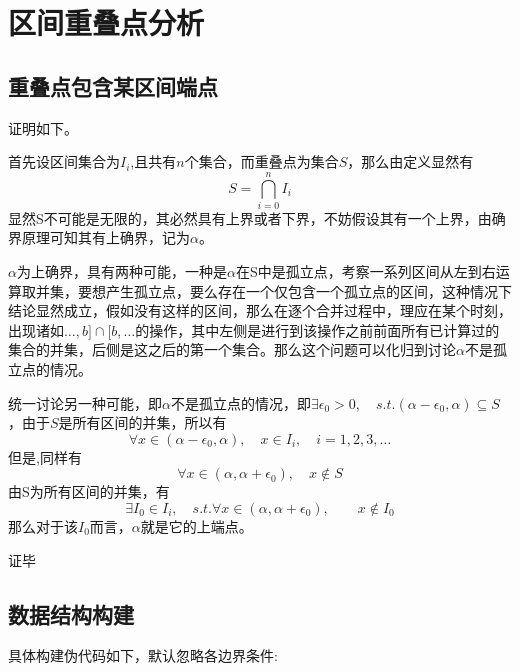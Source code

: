 \documentclass[cn,11pt,chinese]{elegantbook}
\begin{document}
\section{区间重叠点分析}

\subsection{重叠点包含某区间端点}

证明如下。

首先设区间集合为${I_i}$,且共有$n$个集合，而重叠点为集合$S$，那么由定义显然有
\begin{equation}
    S = \bigcap _{i=0}^n I_i \nonumber
\end{equation}
显然S不可能是无限的，其必然具有上界或者下界，不妨假设其有一个上界，由确界原理可知其有上确界，记为$\alpha $。

$\alpha $为上确界，具有两种可能，一种是$\alpha $在S中是孤立点，考察一系列区间从左到右运算取并集，要想产生孤立点，要么存在一个仅包含一个孤立点的区间，这种情况下结论显然成立，假如没有这样的区间，那么在逐个合并过程中，理应在某个时刻，出现诸如$\dots ,b]\cap [b,\dots $的操作，其中左侧是进行到该操作之前前面所有已计算过的集合的并集，后侧是这之后的第一个集合。那么这个问题可以化归到讨论$\alpha $不是孤立点的情况。

统一讨论另一种可能，即$\alpha $不是孤立点的情况，即$\exists \epsilon_0 > 0,\quad s.t. (\alpha - \epsilon_0,\alpha ) \subseteq S $，由于$S$是所有区间的并集，所以有
\begin{equation}
    \forall x \in (\alpha - \epsilon_0 ,\alpha) ,\quad x \in I_i,\quad i=1,2,3,\dots  \nonumber
\end{equation}
但是,同样有
\begin{equation}
    \forall x \in (\alpha ,\alpha + \epsilon_0 ) ,\quad x \notin S  \nonumber
\end{equation}
由S为所有区间的并集，有
\begin{equation}
    \exists I_0 \in {I_i},\quad s.t.\forall x \in (\alpha ,\alpha + \epsilon_0 ) ,\quad \quad x \notin I_0 \nonumber
\end{equation}
那么对于该$I_0$而言，$\alpha $就是它的上端点。

证毕

\subsection{数据结构构建}

具体构建伪代码如下，默认忽略各边界条件:
\end{document}
